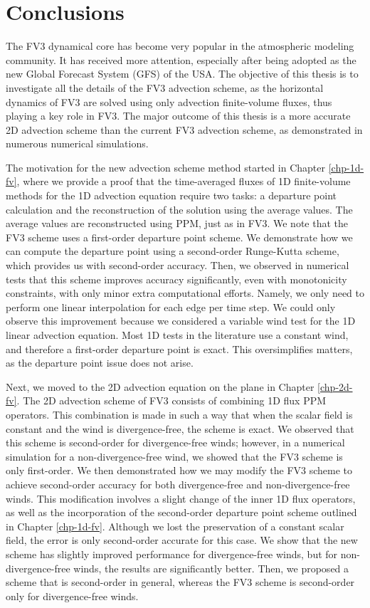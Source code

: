 \chapter{Conclusions}
\label{chp-conclusions}
The FV3 dynamical core has become very popular in the atmospheric modeling community.
It has received more attention, especially after being adopted as the new Global Forecast System (GFS) of the USA.
The objective of this thesis is to investigate all the details of the FV3 advection scheme,
as the horizontal dynamics of FV3 are solved using only advection finite-volume fluxes, thus playing a key role in FV3.
The major outcome of this thesis is a more accurate 2D advection scheme than the current FV3 advection scheme, as demonstrated in numerous numerical simulations.

The motivation for the new advection scheme method started in Chapter \ref{chp-1d-fv}, 
where we provide a proof that the time-averaged fluxes of 1D finite-volume methods for the 1D advection equation require two tasks: 
a departure point calculation and the reconstruction of the solution using the average values.
The average values are reconstructed using PPM, just as in FV3.
We note that the FV3 scheme uses a first-order departure point scheme. 
We demonstrate how we can compute the departure point using a second-order Runge-Kutta scheme, which provides us with second-order accuracy.
Then, we observed in numerical tests that this scheme improves accuracy significantly,  even with monotonicity constraints,
with only minor extra computational efforts.
Namely, we only need to perform one linear interpolation for each edge per time step.
We could only observe this improvement because we considered a  variable wind test for the 1D linear advection equation. 
Most 1D tests in the literature use a constant wind, and therefore a first-order departure point is exact.
This oversimplifies matters, as the departure point issue does not arise.

Next, we moved to the 2D advection equation on the plane in Chapter \ref{chp-2d-fv}.
The 2D advection scheme of FV3 consists of combining 1D flux PPM operators.
This combination is made in such a way that when the scalar field is constant and the wind is divergence-free, the scheme is exact.
We observed that this scheme is second-order for divergence-free winds;
however, in a numerical simulation for a non-divergence-free wind, we showed that the FV3 scheme is only first-order.
We then demonstrated how we may modify the FV3 scheme to achieve second-order accuracy for both divergence-free and non-divergence-free winds. 
This modification involves a slight change of the inner 1D flux operators,
as well as the incorporation of the second-order departure point scheme outlined in Chapter \ref{chp-1d-fv}.
Although we lost the preservation of a constant scalar field, the error is only second-order accurate for this case.
We show that the new scheme has slightly improved performance for divergence-free winds, but for non-divergence-free winds, the results are significantly better.
Then, we proposed a scheme that is second-order in general, whereas the FV3 scheme is second-order only for divergence-free winds.

